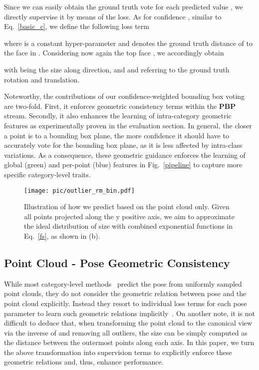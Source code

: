 \documentclass[10pt,twocolumn,letterpaper]{article}
\begin{document}
Since we can easily obtain the ground truth vote for each predicted value , we directly supervise it by means of the  loss.
As for confidence , similar to Eq.~\ref{basic_c}, we define the following loss term

where  is a constant hyper-parameter and  denotes the ground truth distance of  to the face  in .
Considering now again the top face , we accordingly obtain 

with  being the size along  direction, and  and  referring to the ground truth rotation and translation.


Noteworthy, the contributions of our confidence-weighted bounding box voting are two-fold. 
First, it enforces geometric consistency terms within the \textbf{PBP} stream. Secondly, it also enhances the learning of intra-category geometric features as experimentally proven in the evaluation section.
In general, the closer a point is to a bounding box plane, the more confidence it should have to accurately vote for the bounding box plane, as it is less affected by intra-class variations.
As a consequence, these geometric guidance enforces the learning of global (green) and per-point (blue) features in Fig.~\ref{pipeline} to capture more specific category-level traits.

\begin{figure}[t]
  \centering
  \texttt{[image: pic/outlier\_rm\_bin.pdf]}
  \caption{Illustration of how we predict  based on the point cloud only.
  Given all points projected along the y positive axis, we aim to approximate the ideal distribution of size  with combined exponential functions in Eq.~\ref{fs}, as shown in (b).
  }
  \label{outlier}
\end{figure}

\subsection{Point Cloud - Pose Geometric Consistency}
\label{PPGC}
While most category-level methods~\cite{fs-net, dualposenet, sgpa} predict the pose from uniformly sampled point clouds, they do not consider the geometric relation between pose and the point cloud explicitly. Instead they resort to individual loss terms for each pose parameter to learn such geometric relations implicitly~\cite{fs-net,dualposenet,sgpa}. 
On another note, it is not difficult to deduce that, when transforming the point cloud to the canonical view via the inverse of  and removing all outliers, the size  can be simply computed as the distance between the outermost points along each axis.
In this paper, we turn the above transformation into supervision terms to explicitly enforce these geometric relations and, thus, enhance performance.
\end{document}
